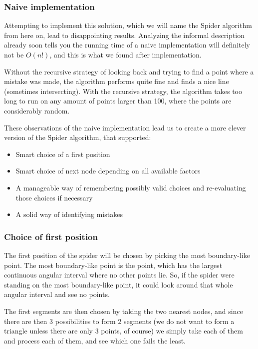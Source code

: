 \documentclass[11pt]{article}
\begin{document}
\subsubsection{Naive implementation} 

Attempting to implement this solution, which we will name the Spider algorithm from here on, lead to disappointing results. Analyzing the informal description already soon tells you the running time of a naive implementation will definitely not be $O(n!)$, and this is what we found after implementation.

Without the recursive strategy of looking back and trying to find a point where a mistake was made, the algorithm performs quite fine and finds a nice line (sometimes intersecting). With the recursive strategy, the algorithm takes too long to run on any amount of points larger than 100, where the points are considerably random.

These observations of the naive implementation lead us to create a more clever version of the Spider algorithm, that supported:
\begin{itemize}
\item Smart choice of a first position
\item Smart choice of next node depending on all available factors
\item A manageable way of remembering possibly valid choices and re-evaluating those choices if necessary
\item A solid way of identifying mistakes
\end{itemize}


\subsubsection{Choice of first position} 

The first position of the spider will be chosen by picking the most boundary-like point. The most boundary-like point is the point, which has the largest continuous angular interval where no other points lie. So, if the spider were standing on the most boundary-like point, it could look around that whole angular interval and see no points.

The first segments are then chosen by taking the two nearest nodes, and since there are then 3 possibilities to form 2 segments (we do not want to form a triangle unless there are only 3 points, of course) we simply take each of them and process each of them, and see which one fails the least.
\end{document}
